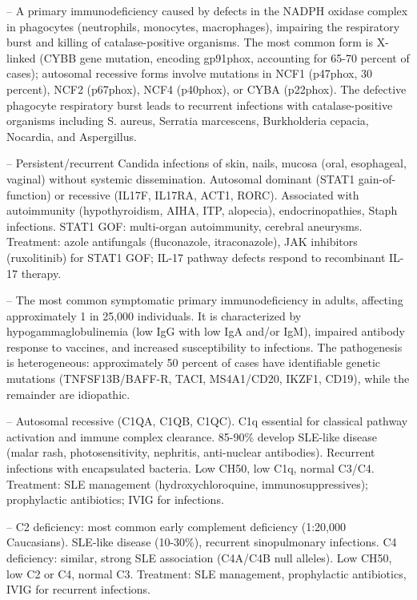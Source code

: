 -- A primary immunodeficiency caused by defects in the NADPH oxidase complex in phagocytes (neutrophils, monocytes, macrophages), impairing the respiratory burst and killing of catalase-positive organisms. The most common form is X-linked (CYBB gene mutation, encoding gp91phox, accounting for 65-70 percent of cases); autosomal recessive forms involve mutations in NCF1 (p47phox, 30 percent), NCF2 (p67phox), NCF4 (p40phox), or CYBA (p22phox). The defective phagocyte respiratory burst leads to recurrent infections with catalase-positive organisms including S. aureus, Serratia marcescens, Burkholderia cepacia, Nocardia, and Aspergillus.

-- Persistent/recurrent Candida infections of skin, nails, mucosa (oral, esophageal, vaginal) without systemic dissemination. Autosomal dominant (STAT1 gain-of-function) or recessive (IL17F, IL17RA, ACT1, RORC). Associated with autoimmunity (hypothyroidism, AIHA, ITP, alopecia), endocrinopathies, Staph infections. STAT1 GOF: multi-organ autoimmunity, cerebral aneurysms. Treatment: azole antifungals (fluconazole, itraconazole), JAK inhibitors (ruxolitinib) for STAT1 GOF; IL-17 pathway defects respond to recombinant IL-17 therapy.

-- The most common symptomatic primary immunodeficiency in adults, affecting approximately 1 in 25,000 individuals. It is characterized by hypogammaglobulinemia (low IgG with low IgA and/or IgM), impaired antibody response to vaccines, and increased susceptibility to infections. The pathogenesis is heterogeneous: approximately 50 percent of cases have identifiable genetic mutations (TNFSF13B/BAFF-R, TACI, MS4A1/CD20, IKZF1, CD19), while the remainder are idiopathic.

-- Autosomal recessive (C1QA, C1QB, C1QC). C1q essential for classical pathway activation and immune complex clearance. 85-90\% develop SLE-like disease (malar rash, photosensitivity, nephritis, anti-nuclear antibodies). Recurrent infections with encapsulated bacteria. Low CH50, low C1q, normal C3/C4. Treatment: SLE management (hydroxychloroquine, immunosuppressives); prophylactic antibiotics; IVIG for infections.

-- C2 deficiency: most common early complement deficiency (1:20,000 Caucasians). SLE-like disease (10-30\%), recurrent sinopulmonary infections. C4 deficiency: similar, strong SLE association (C4A/C4B null alleles). Low CH50, low C2 or C4, normal C3. Treatment: SLE management, prophylactic antibiotics, IVIG for recurrent infections.

